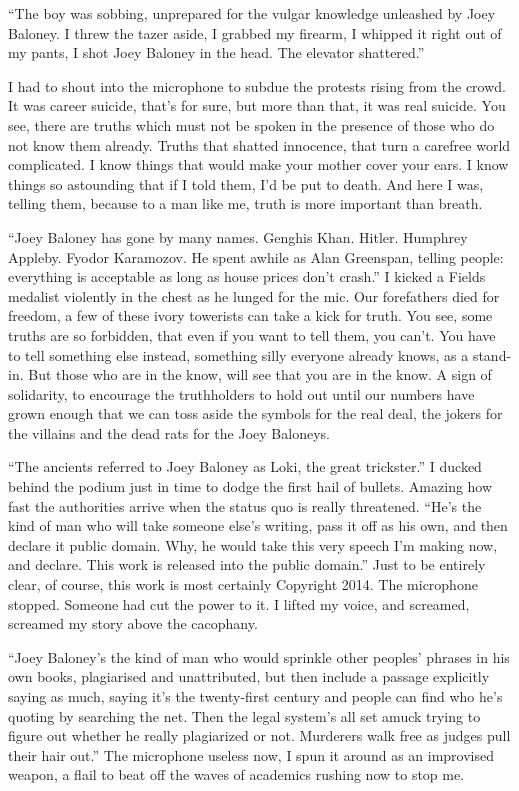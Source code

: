 \documentclass{memoir}
\begin{document}
``The boy was sobbing, unprepared for the vulgar knowledge unleashed by Joey Baloney.
I threw the tazer aside, I grabbed my firearm, I whipped it right out of my pants, I shot
Joey Baloney in the head.  The elevator shattered.''

I had to shout into the microphone to subdue the protests rising from
the crowd.  It was career suicide, that's for sure, but more than that, it was real suicide.
You see, there are truths which must not be spoken in the presence of those who do not
know them already.  Truths that shatted innocence, that turn a carefree world complicated.
I know things that would make your mother cover your ears.  I know things so astounding that
if I told them, I'd be put to death.  And here I was, telling them, because to a man like me,
truth is more important than breath.

``Joey Baloney has gone by many names.  Genghis Khan.  Hitler.  Humphrey Appleby.
Fyodor Karamozov.  He spent awhile as Alan Greenspan, telling people:  everything is
acceptable as long as house prices don't crash.''  I kicked a Fields medalist violently
in the chest as he lunged for the mic.  Our forefathers died for freedom, a few of these
ivory towerists can take a kick for truth.  You see, some truths are so forbidden, that
even if you want to tell them, you can't.  You have to tell something else instead, something
silly everyone already knows, as a stand-in.  But those who are in the know, will see that
you are in the know.  A sign of solidarity, to encourage the truthholders to hold out until
our numbers have grown enough that we can toss aside the symbols for the real deal, the
jokers for the villains and the dead rats for the Joey Baloneys.

``The ancients referred to Joey Baloney as Loki, the great trickster.''  I ducked behind the
podium just in time to dodge the first hail of bullets.  Amazing how fast the authorities arrive
when the status quo is really threatened.  ``He's the kind of man who will take someone else's
writing, pass it off as his own, and then declare it public domain.  Why, he would take this
very speech I'm making now, and declare.  This work is released into the public domain.''
Just to be entirely clear, of course, this work is most certainly Copyright 2014.  The microphone
stopped.  Someone had cut the power to it.  I lifted my voice, and screamed, screamed my story
above the cacophany.

``Joey Baloney's the kind of man who would sprinkle other peoples' phrases in his own books,
plagiarised and unattributed, but then include a passage explicitly saying as much, saying it's
the twenty-first century and people can find who he's quoting by searching the net.  Then the
legal system's all set amuck trying to figure out whether he really plagiarized or not.  Murderers
walk free as judges pull their hair out.''  The microphone useless now, I spun it around as an
improvised weapon, a flail to beat off the waves of academics rushing now to stop me.
\end{document}
